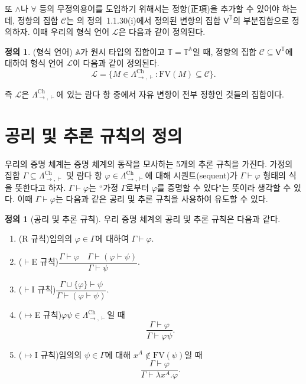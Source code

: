 \documentclass[10pt,twocolumn]{article}
\theoremstyle{definition}
\newtheorem{definition}[theorem]{정의}
\newcommand{\Lchh}{\Lambda_{\to,\vdash}^{\text{Ch}}}
\begin{document}
또 $\land$나 $\forall$ 등의 무정의용어를 도입하기 위해서는 정항(正項)을 추가할 수 있어야 하는데, 정항의 집합 $\mathcal C$는 \cite{luswt}의 정의~1.1.30(i)에서 정의된 변항의 집합 $\mathsf V^{\mathds T}$의 부분집합으로 정의하자. 이때 우리의 형식 언어 $\mathcal L$은 다음과 같이 정의된다.

\begin{definition}(형식 언어)
	$\mathbb A$가 원시 타입의 집합이고 $\mathds T = \mathds T^{\mathbb A}$일 때, 정항의 집합 $\mathcal C\subseteq \mathsf V^{\mathds T}$에 대하여 형식 언어 $\mathcal L$이 다음과 같이 정의된다.
	$$\mathcal L = \{M\in\Lchh: \mathrm{FV}(M)\subseteq\mathcal C\}.$$
\end{definition}

즉 $\mathcal L$은 $\Lchh$에 있는 람다 항 중에서 자유 변항이 전부 정항인 것들의 집합이다.

\section{공리 및 추론 규칙의 정의}

우리의 증명 체계는 증명 체계의 동작을 모사하는 5개의 추론 규칙을 가진다. 가정의 집합 $\Gamma\subseteq\Lchh$ 및 람다 항 $\varphi\in\Lchh$에 대해 시퀀트(sequent)가 $\Gamma\vdash\varphi$ 형태의 식을 뜻한다고 하자. $\Gamma\vdash\varphi$는 ``가정 $\Gamma$로부터 $\varphi$를 증명할 수 있다"는 뜻이라 생각할 수 있다. 이때 $\Gamma\vdash\varphi$는 다음과 같은 공리 및 추론 규칙을 사용하여 유도할 수 있다.

\begin{definition}[공리 및 추론 규칙]
	우리 증명 체계의 공리 및 추론 규칙은 다음과 같다.
	
	\begin{enumerate}
		\item (R 규칙)\quad 임의의 $\varphi\in\Gamma$에 대하여 $\Gamma\vdash\varphi.$
		\item ($\vdash$E 규칙)\quad $\dfrac{\Gamma\vdash\varphi\quad\Gamma\vdash(\varphi\vdash\psi)}{\Gamma\vdash\psi}.$
		\item ($\vdash$I 규칙)\quad $\dfrac{\Gamma\cup\{\varphi\}\vdash\psi}{\Gamma\vdash(\varphi\vdash\psi)}.$
		\item ($\mapsto$E 규칙)\quad $\varphi\psi\in\Lchh$일 때 $$\dfrac{\Gamma\vdash\varphi}{\Gamma\vdash\varphi\psi}.$$
		\item ($\mapsto$I 규칙)\quad 임의의 $\psi\in\Gamma$에 대해 $x^A\notin\mathrm{FV}(\psi)$일 때 $$\dfrac{\Gamma\vdash\varphi}{\Gamma\vdash\lambda x^A.\varphi}.$$
	\end{enumerate}
\end{definition}
\end{document}
